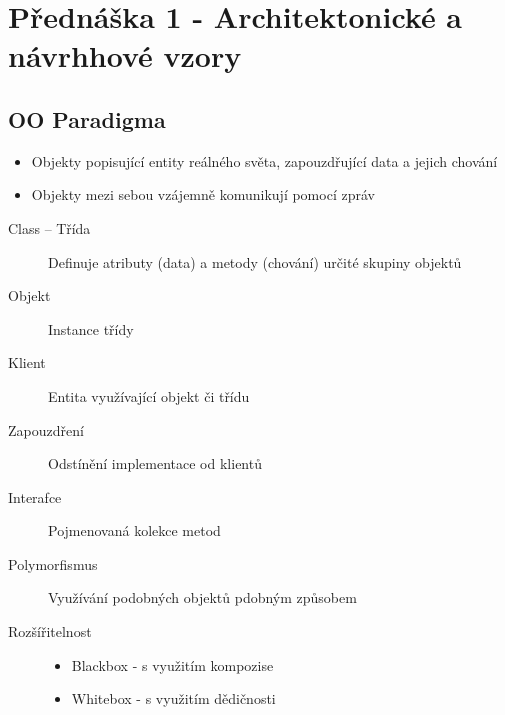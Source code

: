 \section{Přednáška 1 - Architektonické a návrhhové vzory}

\subsection{OO Paradigma}

\begin{itemize}
    \item Objekty popisující entity reálného světa, zapouzdřující data a jejich chování
    \item Objekty mezi sebou vzájemně komunikují pomocí zpráv
\end{itemize}

\begin{description}
    \item[Class -- Třída] Definuje atributy (data) a metody (chování) určité skupiny objektů
    \item[Objekt] Instance třídy
    \item[Klient] Entita využívající objekt či třídu
    \item[Zapouzdření] Odstínění implementace od klientů
    \item[Interafce] Pojmenovaná kolekce metod
    \item[Polymorfismus] Využívání podobných objektů pdobným způsobem
    \item[Rozšířitelnost]
        \begin{itemize}
            \item Blackbox - s využitím kompozise
            \item Whitebox - s využitím dědičnosti
        \end{itemize}
\end{description}
